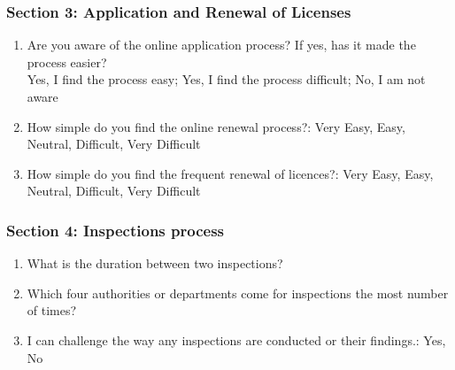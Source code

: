\documentclass[a4paper, 12pt]{article}
\begin{document}
\begin {enumerate}
	\subsubsection {Section 3: Application and Renewal of Licenses}
		\begin {enumerate}
		\item Are you aware of the online application process? If yes, has it made the process easier?\\
		Yes, I find the process easy; Yes, I find the process difficult; No, I am not aware\\
		\item How simple do you find the online renewal process?: Very Easy, Easy, Neutral, Difficult, Very Difficult\\
		\item How simple do you find the frequent renewal of licences?: Very Easy, Easy, Neutral, Difficult, Very Difficult\\
		\end {enumerate}

	\subsubsection {Section 4: Inspections process}
		\begin {enumerate} 
		\item What is the duration between two inspections?
		\item Which four authorities or departments come for inspections the most number of times?
		\item I can challenge the way any inspections are conducted or their findings.: Yes, No


\end{enumerate}
\end{enumerate}
\end{document}
